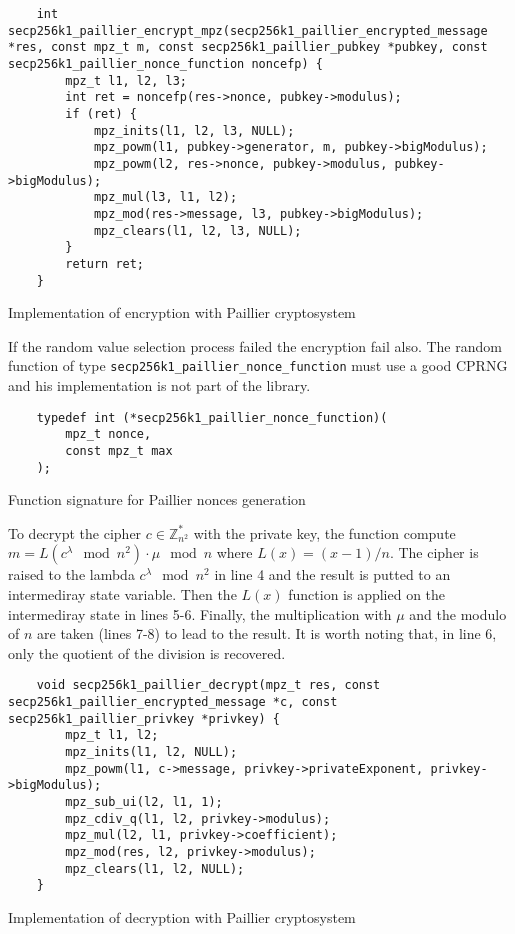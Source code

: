 \begin{listing}
  \begin{verbatim}
    int secp256k1_paillier_encrypt_mpz(secp256k1_paillier_encrypted_message *res, const mpz_t m, const secp256k1_paillier_pubkey *pubkey, const secp256k1_paillier_nonce_function noncefp) {
        mpz_t l1, l2, l3;
        int ret = noncefp(res->nonce, pubkey->modulus);
        if (ret) {
            mpz_inits(l1, l2, l3, NULL);
            mpz_powm(l1, pubkey->generator, m, pubkey->bigModulus);
            mpz_powm(l2, res->nonce, pubkey->modulus, pubkey->bigModulus);
            mpz_mul(l3, l1, l2);
            mpz_mod(res->message, l3, pubkey->bigModulus);
            mpz_clears(l1, l2, l3, NULL);
        }
        return ret;
    }
  \end{verbatim}
	\caption{Implementation of encryption with Paillier cryptosystem}
	\label{lst:implEncryptPaillier}
\end{listing}

If the random value selection
process failed the encryption fail also. The random function of type
\texttt{secp256k1\_paillier\_nonce\_function} must use a good CPRNG and his implementation
is not part of the library.

\begin{listing}
  \begin{verbatim}
    typedef int (*secp256k1_paillier_nonce_function)(
        mpz_t nonce,
        const mpz_t max
    );
  \end{verbatim}
	\caption{Function signature for Paillier nonces generation}
	\label{lst:PaillierNoncesSigFunc}
\end{listing}

To decrypt the cipher $c \in \mathbb{Z}_{n^2}^*$ with the private key, the function
compute $m = L(c^{\lambda} \mod n^2) \cdot \mu \mod n$ where $L(x) = (x - 1) / n$.
The cipher is raised to the lambda $c^{\lambda} \mod n^2$ in line 4 and the result
is putted to an intermediray state variable. Then the $L(x)$ function is applied
on the intermediray state in lines 5-6. Finally, the multiplication with $\mu$ and
the modulo of $n$ are taken (lines 7-8) to lead to the result. It is worth noting
that, in line 6, only the quotient of the division is recovered.

\begin{listing}
  \begin{verbatim}
    void secp256k1_paillier_decrypt(mpz_t res, const secp256k1_paillier_encrypted_message *c, const secp256k1_paillier_privkey *privkey) {
        mpz_t l1, l2;
        mpz_inits(l1, l2, NULL);
        mpz_powm(l1, c->message, privkey->privateExponent, privkey->bigModulus);
        mpz_sub_ui(l2, l1, 1);
        mpz_cdiv_q(l1, l2, privkey->modulus);
        mpz_mul(l2, l1, privkey->coefficient);
        mpz_mod(res, l2, privkey->modulus);
        mpz_clears(l1, l2, NULL);
    }
  \end{verbatim}
	\caption{Implementation of decryption with Paillier cryptosystem}
	\label{lst:implDecryptPaillier}
\end{listing}


